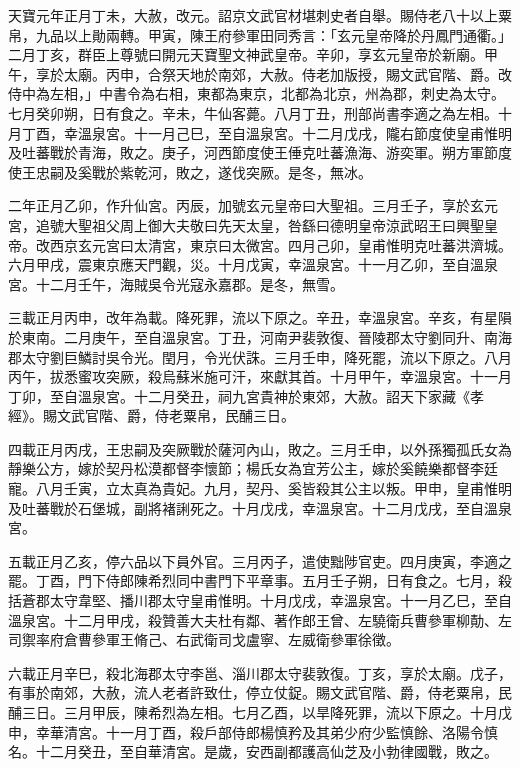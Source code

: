 \begin{pinyinscope}
 天寶元年正月丁未，大赦，改元。詔京文武官材堪刺史者自舉。賜侍老八十以上粟帛，九品以上勛兩轉。甲寅，陳王府參軍田同秀言：「玄元皇帝降於丹鳳門通衢。」二月丁亥，群臣上尊號曰開元天寶聖文神武皇帝。辛卯，享玄元皇帝於新廟。甲午，享於太廟。丙申，合祭天地於南郊，大赦。侍老加版授，賜文武官階、爵。改侍中為左相，」中書令為右相，東都為東京，北都為北京，州為郡，刺史為太守。七月癸卯朔，日有食之。辛未，牛仙客薨。八月丁丑，刑部尚書李適之為左相。十月丁酉，幸溫泉宮。十一月己巳，至自溫泉宮。十二月戊戌，隴右節度使皇甫惟明及吐蕃戰於青海，敗之。庚子，河西節度使王倕克吐蕃漁海、游奕軍。朔方軍節度使王忠嗣及奚戰於紫乾河，敗之，遂伐突厥。是冬，無冰。



 二年正月乙卯，作升仙宮。丙辰，加號玄元皇帝曰大聖祖。三月壬子，享於玄元宮，追號大聖祖父周上御大夫敬曰先天太皇，咎繇曰德明皇帝涼武昭王曰興聖皇帝。改西京玄元宮曰太清宮，東京曰太微宮。四月己卯，皇甫惟明克吐蕃洪濟城。六月甲戌，震東京應天門觀，災。十月戊寅，幸溫泉宮。十一月乙卯，至自溫泉宮。十二月壬午，海賊吳令光寇永嘉郡。是冬，無雪。



 三載正月丙申，改年為載。降死罪，流以下原之。辛丑，幸溫泉宮。辛亥，有星隕於東南。二月庚午，至自溫泉宮。丁丑，河南尹裴敦復、晉陵郡太守劉同升、南海郡太守劉巨鱗討吳令光。閏月，令光伏誅。三月壬申，降死罷，流以下原之。八月丙午，拔悉蜜攻突厥，殺烏蘇米施可汗，來獻其首。十月甲午，幸溫泉宮。十一月丁卯，至自溫泉宮。十二月癸丑，祠九宮貴神於東郊，大赦。詔天下家藏《孝經》。賜文武官階、爵，侍老粟帛，民酺三日。



 四載正月丙戌，王忠嗣及突厥戰於薩河內山，敗之。三月壬申，以外孫獨孤氏女為靜樂公方，嫁於契丹松漠都督李懷節；楊氏女為宜芳公主，嫁於奚饒樂都督李廷寵。八月壬寅，立太真為貴妃。九月，契丹、奚皆殺其公主以叛。甲申，皇甫惟明及吐蕃戰於石堡城，副將褚誗死之。十月戊戌，幸溫泉宮。十二月戊戌，至自溫泉宮。



 五載正月乙亥，停六品以下員外官。三月丙子，遣使黜陟官吏。四月庚寅，李適之罷。丁酉，門下侍郎陳希烈同中書門下平章事。五月壬子朔，日有食之。七月，殺括蒼郡太守韋堅、播川郡太守皇甫惟明。十月戊戌，幸溫泉宮。十一月乙巳，至自溫泉宮。十二月甲戌，殺贊善大夫杜有鄰、著作郎王曾、左驍衛兵曹參軍柳勣、左司禦率府倉曹參軍王脩己、右武衛司戈盧寧、左威衛參軍徐徵。



 六載正月辛巳，殺北海郡太守李邕、淄川郡太守裴敦復。丁亥，享於太廟。戊子，有事於南郊，大赦，流人老者許致仕，停立仗鋜。賜文武官階、爵，侍老粟帛，民酺三日。三月甲辰，陳希烈為左相。七月乙酉，以旱降死罪，流以下原之。十月戊申，幸華清宮。十一月丁酉，殺戶部侍郎楊慎矜及其弟少府少監慎餘、洛陽令慎名。十二月癸丑，至自華清宮。是歲，安西副都護高仙芝及小勃律國戰，敗之。




\end{pinyinscope}

